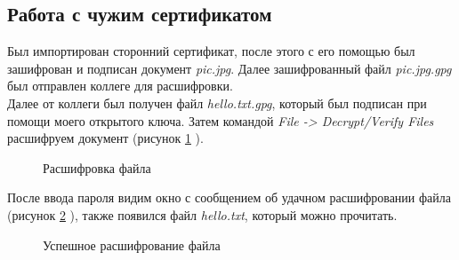 \documentclass[10pt,a4paper]{report}
\begin{document}
\subsection{Работа с чужим сертификатом}
Был импортирован сторонний сертификат, после этого с его помощью был зашифрован и подписан документ \textit{pic.jpg}. Далее зашифрованный файл \textit{pic.jpg.gpg} был отправлен коллеге для расшифровки. \\
Далее от коллеги был получен файл \textit{hello.txt.gpg}, который был подписан при помощи моего открытого ключа. Затем командой \textit{File -> Decrypt/Verify Files} расшифруем документ (рисунок \ref{ris:image6} ). 
\begin{figure}[h]	
\caption{Расшифровка файла}
\label{ris:image6}
\end{figure}

После ввода пароля видим окно с сообщением об удачном расшифровании файла 
(рисунок \ref{ris:image7} ), также появился файл \textit{hello.txt}, который можно прочитать.
\begin{figure}[h]	
\caption{Успешное расшифрование файла}
\label{ris:image7}
\end{figure}
\newpage
\end{document}
